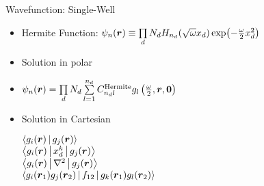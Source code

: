 \documentclass[10pt, t]{beamer}
\begin{document}
\begin{frame}[fragile]{Wavefunction: Single-Well}
    \begin{itemize}[<+->]
        \item Hermite Function: $\psi_n(\boldsymbol{{r}}) \equiv \prod\limits_d N_d
            H_{n_d}(\sqrt{\omega}x_d)\exp(-\frac{\omega}{2}x^2_d)$
        \item Solution in polar
        \item $\psi_n(\boldsymbol{{r}}) = \prod\limits_d N_d \sum\limits^{n_d}_{l=1}
            C^{\text{Hermite}}_{n_dl}
            g_l\left(\frac{\omega}{2},\boldsymbol{{r}},\boldsymbol{{0}}\right)$
        \item Solution in Cartesian \\ \vspace{0.2cm} \hspace{1cm}
            \begin{minipage}[H]{0.5\textwidth}
                $\Braket{g_i(\boldsymbol{{r}})|g_j(\boldsymbol{{r}})}$ \vsp \\
                $\Braket{g_i(\boldsymbol{{r}})|x^k_d|g_j(\boldsymbol{{r}})}$ \vsp \\
                $\Braket{g_i(\boldsymbol{{r}})|\nabla^2|g_j(\boldsymbol{{r}})}$ \vsp \\
                $\Braket{g_i(\boldsymbol{{r}}_1)g_j(\boldsymbol{{r}}_2)|f_{12}|g_k(\boldsymbol{{r}}_1)g_l(\boldsymbol{{r}}_2)}$ \\
            \end{minipage}
    \end{itemize}
\end{frame}
\end{document}
